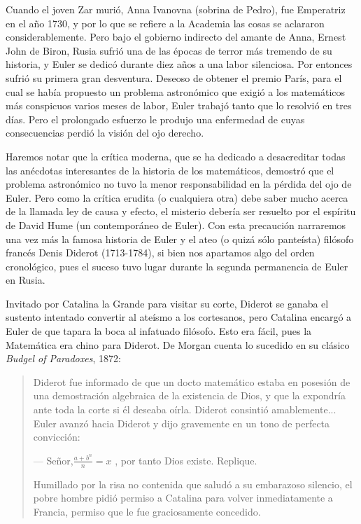 \documentclass[a4paper, 12pt]{article}
\begin{document}
Cuando el joven Zar murió, Anna Ivanovna (sobrina de Pedro), fue Emperatriz en el año 1730, y por lo que se refiere a la Academia las cosas se aclararon considerablemente. Pero bajo el gobierno indirecto del amante de Anna, Ernest John de Biron, Rusia sufrió una de las épocas de terror más tremendo de su historia, y Euler se dedicó durante diez años a una labor silenciosa. Por entonces sufrió su primera gran desventura. Deseoso de obtener el premio París, para el cual se había propuesto un problema astronómico que exigió a los matemáticos más conspicuos varios meses de labor, Euler trabajó tanto que lo resolvió en tres días. Pero el prolongado esfuerzo le produjo una enfermedad de cuyas consecuencias perdió la visión del ojo derecho.

Haremos notar que la crítica moderna, que se ha dedicado a desacreditar todas las anécdotas interesantes de la historia de los matemáticos, demostró que el problema astronómico no tuvo la menor responsabilidad en la pérdida del ojo de Euler. Pero como la crítica erudita (o cualquiera otra) debe saber mucho acerca de la llamada ley de causa y efecto, el misterio debería ser resuelto por el espíritu de David Hume (un contemporáneo de Euler). Con esta precaución narraremos una vez más la famosa historia de Euler y el ateo (o quizá sólo panteísta) filósofo francés Denis Diderot (1713-1784), si bien nos apartamos algo del orden cronológico, pues el suceso tuvo lugar durante la segunda permanencia de Euler en Rusia.

Invitado por Catalina la Grande para visitar su corte, Diderot se ganaba el sustento intentado convertir al ateísmo a los cortesanos, pero Catalina encargó a Euler de que tapara la boca al infatuado filósofo. Esto era fácil, pues la Matemática era chino para Diderot. De Morgan cuenta lo sucedido en su clásico {\it Budgel of Paradoxes}, 1872:

\begin{quote}\small

 Diderot fue informado de que un docto matemático estaba en posesión de una demostración algebraica de la existencia de Dios, y que la expondría ante toda la corte si él deseaba oírla. Diderot consintió amablemente... Euler avanzó hacia Diderot y dijo gravemente en un tono de perfecta convicción:

--- Señor,$\frac{a+b^n}{n}=x$ , por tanto Dios existe. Replique.

Humillado por la risa no contenida que saludó a su embarazoso silencio, el pobre hombre pidió permiso a Catalina para volver inmediatamente a Francia, permiso que le fue graciosamente concedido.

\end{quote}
\end{document}
